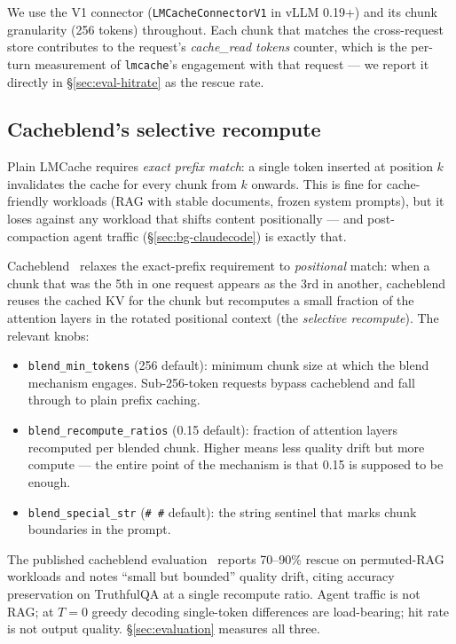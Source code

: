 We use the V1 connector
(\texttt{LMCacheConnectorV1} in vLLM 0.19+) and its chunk granularity
(256 tokens) throughout. Each chunk that matches the cross-request store
contributes to the request's \emph{cache\_read tokens} counter, which is
the per-turn measurement of \texttt{lmcache}'s engagement with that
request --- we report it directly in \S\ref{sec:eval-hitrate} as the
rescue rate.

\subsection{Cacheblend's selective recompute}
\label{sec:bg-cacheblend}

Plain LMCache requires \emph{exact prefix match}: a single token
inserted at position $k$ invalidates the cache for every chunk from $k$
onwards. This is fine for cache-friendly workloads (RAG with stable
documents, frozen system prompts), but it loses against any workload
that shifts content positionally --- and post-compaction agent traffic
(\S\ref{sec:bg-claudecode}) is exactly that.

Cacheblend~\cite{lmcache-cacheblend} relaxes the exact-prefix
requirement to \emph{positional} match: when a chunk that was the 5th
in one request appears as the 3rd in another, cacheblend reuses the
cached KV for the chunk but recomputes a small fraction of the
attention layers in the rotated positional context (the
\emph{selective recompute}). The relevant knobs:

\begin{itemize}
\item \texttt{blend\_min\_tokens} (256 default): minimum chunk size at
  which the blend mechanism engages. Sub-256-token requests bypass
  cacheblend and fall through to plain prefix caching.
\item \texttt{blend\_recompute\_ratios} (0.15 default): fraction of
  attention layers recomputed per blended chunk. Higher means less
  quality drift but more compute --- the entire point of the mechanism
  is that 0.15 is supposed to be enough.
\item \texttt{blend\_special\_str} (\texttt{\#\,\#} default): the
  string sentinel that marks chunk boundaries in the prompt.
\end{itemize}

The published cacheblend evaluation~\cite{lmcache-cacheblend} reports
70--90\% rescue on permuted-RAG workloads and notes ``small but
bounded'' quality drift, citing accuracy preservation on TruthfulQA at
a single recompute ratio. Agent traffic is not RAG; at $T=0$ greedy
decoding single-token differences are load-bearing; hit rate is not
output quality. \S\ref{sec:evaluation} measures all three.

